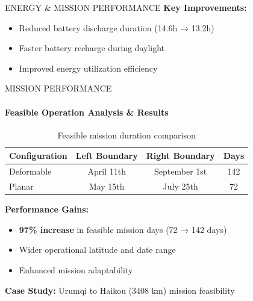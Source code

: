 \documentclass{beamer}
\begin{document}
\begin{frame}{ENERGY \& MISSION PERFORMANCE}
    \vspace{0.3cm}
    \textbf{Key Improvements:}
    \begin{itemize}
        \item Reduced battery discharge duration (14.6h → 13.2h)
        \item Faster battery recharge during daylight
        \item Improved energy utilization efficiency
    \end{itemize}
\end{frame}

\begin{frame}{MISSION PERFORMANCE}
    \framesubtitle{Feasible Operation Analysis \& Results}
    
    \begin{table}
        \centering
        \begin{tabular}{|l|c|c|c|}
            \hline
            \textbf{Configuration} & \textbf{Left Boundary} & \textbf{Right Boundary} & \textbf{Days} \\
            \hline
            Deformable & April 11th & September 1st & 142 \\
            Planar & May 15th & July 25th & 72 \\
            \hline
        \end{tabular}
        \caption{Feasible mission duration comparison}
    \end{table}
    
    \textbf{Performance Gains:}
    \begin{itemize}
        \item \textbf{97\% increase} in feasible mission days (72 → 142 days)
        \item Wider operational latitude and date range
        \item Enhanced mission adaptability
    \end{itemize}
    
    \vspace{0.3cm}
    \textbf{Case Study:} Urumqi to Haikou (3408 km) mission feasibility
\end{frame}
\end{document}
